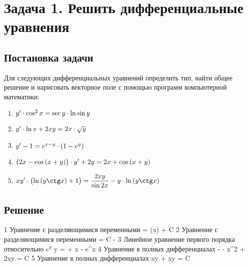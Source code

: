 

\section{Задача 1. Решить дифференциальные уравнения}
\subsection{Постановка задачи}
Для следующих дифференциальных уравнений определить тип, найти общее
решение и нарисовать векторное поле с помощью программ компьютерной математики:

\begin{enumerate}
	\item $ {y}' \cdot \cos^{2}{x} = \sec{y} \cdot \ln{\sin{y}} $
	\item $ {y}' \cdot \ln{x} + 2xy = 2x \cdot \sqrt{y} $
	\item $ {y}' - 1 = e^{x-y} \cdot (1 - e^{y}) $    
	\item $ \mathopen{}\left( {2x - \cos{(x + y)}}_{{}_{}}\,\negthickspace\right)\mathclose{} \cdot {y}' + 2y = 2{x} + \cos{(x + y)} $
	\item $ \equationFifth $
\end{enumerate}

\newpage

\subsection{Решение}
\begin{enumerate}
	\taskOneSolutionItem
		{1}
		{\equationFirst}
		{Уравнение с разделяющимися переменными}
		{ = \tan(x) + {C}}
	\taskOneSolutionItem
		{2}
		{\equationSecond}
		{Уравнение с разделяющимися переменными}
		{ = C - }
	\taskOneSolutionItem
		{3}
		{\equationThird}
		{Линейное уравнение первого порядка относительно $ e^y $}
		{y =  + {x} - e^{x}}
	\taskOneSolutionItem
		{4}
		{\equationFourth}
		{Уравнение в полных дифференциалах}
		{- - {x}^2 + 2xy = C}
	\taskOneSolutionItem
		{5}
		{\equationFifth}
		{Уравнение в полных дифференциалах}
		{xy + xy = C}
\end{enumerate}
